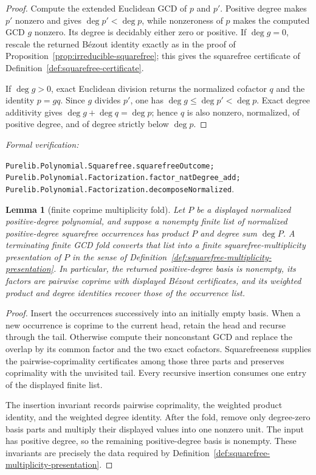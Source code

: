 \documentclass[11pt]{article}
\newtheorem{lemma}[theorem]{Lemma}
\newcommand{\Defref}[1]{Definition~\ref{#1}}
\newcommand{\leanref}[1]{\par\smallskip\noindent
  \emph{Formal verification:}\par\nobreak
  {\raggedright\nolinkurl{#1}.\par}}
\begin{document}
\begin{proof}
Compute the extended Euclidean GCD of $p$ and $p'$.  Positive degree makes
$p'$ nonzero and gives $\deg p'<\deg p$, while nonzeroness of $p$ makes the
computed GCD $g$ nonzero.  Its degree is decidably either zero or positive.
If $\deg g=0$, rescale the returned B\'ezout identity exactly as in the proof
of Proposition~\ref{prop:irreducible-squarefree}; this gives the squarefree certificate
of \Defref{def:squarefree-certificate}.

If $\deg g>0$, exact Euclidean division returns the normalized cofactor $q$
and the identity $p=gq$.  Since $g$ divides $p'$, one has
$\deg g\le\deg p'<\deg p$.  Exact degree additivity gives
$\deg g+\deg q=\deg p$; hence $q$ is also nonzero, normalized, of positive
degree, and of degree strictly below $\deg p$.
\end{proof}

\leanref{Purelib.Polynomial.Squarefree.squarefreeOutcome;
Purelib.Polynomial.Factorization.factor_natDegree_add;
Purelib.Polynomial.Factorization.decomposeNormalized}

\begin{lemma}[finite coprime multiplicity fold]
\label{lem:coprime-multiplicity-fold}
Let $P$ be a displayed normalized positive-degree polynomial, and suppose a
nonempty finite list of normalized positive-degree squarefree occurrences
has product $P$ and degree sum $\deg P$.  A terminating finite GCD
fold converts that list into a finite squarefree-multiplicity presentation of
$P$ in the sense of \Defref{def:squarefree-multiplicity-presentation}.
In particular, the returned positive-degree basis is nonempty, its factors
are pairwise coprime with displayed B\'ezout certificates, and its weighted
product and degree identities recover those of the occurrence list.
\end{lemma}

\begin{proof}
Insert the occurrences successively into an initially empty basis.  When a
new occurrence is coprime to the current head, retain the head and recurse
through the tail.  Otherwise compute their nonconstant GCD and replace the
overlap by its common factor and the two exact cofactors.  Squarefreeness
supplies the pairwise-coprimality certificates among those three parts and
preserves coprimality with the unvisited tail.  Every recursive insertion
consumes one entry of the displayed finite list.

The insertion invariant records pairwise coprimality, the weighted product
identity, and the weighted degree identity.  After the fold, remove only
degree-zero basis parts and multiply their displayed values into one nonzero
unit.  The input has positive degree, so the remaining positive-degree basis
is nonempty.  These invariants are precisely the data required by
\Defref{def:squarefree-multiplicity-presentation}.
\end{proof}
\end{document}
